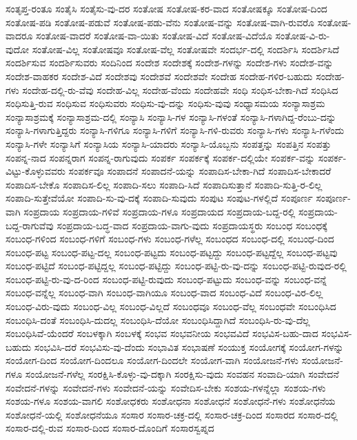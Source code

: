 {ಸಂತೃಪ್ತ-ರಂತೂ
ಸಂತೈಸಿ
ಸಂತೈಸು-ವು-ದರ
ಸಂತೋಷ
ಸಂತೋಷ-ಕರ-ವಾದ
ಸಂತೋಷಕ್ಕೂ
ಸಂತೋಷ-ದಿಂದ
ಸಂತೋಷ-ಪಡಿ
ಸಂತೋಷ-ಪಡುವೆ
ಸಂತೋಷ-ಪಡು-ವೆನು
ಸಂತೋಷ-ವನ್ನು
ಸಂತೋಷ-ವಾಗಿ-ರುವರೊ
ಸಂತೋಷ-ವಾದರೂ
ಸಂತೋಷ-ವಾದರೆ
ಸಂತೋಷ-ವಾ-ಯಿತು
ಸಂತೋಷ-ವಿದೆ
ಸಂತೋಷ-ವಿದೆಯೊ
ಸಂತೋಷ-ವಿ-ರು-ವುದೋ
ಸಂತೋಷ-ವಿಲ್ಲ
ಸಂತೋಷವೂ
ಸಂತೋಷ-ವೆಲ್ಲ
ಸಂತೋಷವೇ
ಸಂದರ್ಭ-ದಲ್ಲಿ
ಸಂದರ್ಶಿಸಿ
ಸಂದರ್ಶಿಸಿದೆ
ಸಂದರ್ಶಿಸುವ
ಸಂದರ್ಶಿಸುವರು
ಸಂದಿನಿಂದ
ಸಂದೇಶ
ಸಂದೇಶಕ್ಕೆ
ಸಂದೇಶ-ಗಳನ್ನು
ಸಂದೇಶ-ಗಳು
ಸಂದೇಶ-ವನ್ನು
ಸಂದೇಶ-ವಾಹಕರ
ಸಂದೇಶ-ವಿದೆ
ಸಂದೇಶವು
ಸಂದೇಶವೆ
ಸಂದೇಶವೇ
ಸಂದೇಹ
ಸಂದೇಹ-ಗಳಿರ-ಬಹುದು
ಸಂದೇಹ-ಗಳು
ಸಂದೇಹ-ದಲ್ಲಿ-ರು-ವೆವು
ಸಂದೇಹ-ವಿಲ್ಲ
ಸಂದೇಹ-ವೆಂದು
ಸಂದೇಹವೇ
ಸಂಧಿ
ಸಂಧಿಸ-ಬೇಕಾ-ಗಿದೆ
ಸಂಧಿಸಿದ
ಸಂಧಿಸುತ್ತಿ-ರುವ
ಸಂಧಿಸುವ
ಸಂಧಿಸುವರು
ಸಂಧಿಸು-ವು-ದನ್ನು
ಸಂಧಿಸು-ವುವು
ಸಂಧ್ಯಾಸಮಯ
ಸಂನ್ಯಾಸಾಶ್ರಮ
ಸಂನ್ಯಾಸಾಶ್ರಮಕ್ಕೆ
ಸಂನ್ಯಾಸಾಶ್ರಮ-ದಲ್ಲಿ
ಸಂನ್ಯಾಸಿ
ಸಂನ್ಯಾಸಿ-ಗಳ
ಸಂನ್ಯಾಸಿ-ಗಳಂತೆ
ಸಂನ್ಯಾಸಿ-ಗಳಾಗಿದ್ದ-ರೆಂಬು-ದನ್ನು
ಸಂನ್ಯಾಸಿ-ಗಳಾಗುತ್ತಿದ್ದರು
ಸಂನ್ಯಾಸಿ-ಗಳಿಗೂ
ಸಂನ್ಯಾಸಿ-ಗಳಿಗೆ
ಸಂನ್ಯಾಸಿ-ಗಳಿ-ರುವರು
ಸಂನ್ಯಾಸಿ-ಗಳು
ಸಂನ್ಯಾಸಿ-ಗಳೆಂದು
ಸಂನ್ಯಾಸಿ-ಗಳೇ
ಸಂನ್ಯಾಸಿಗೆ
ಸಂನ್ಯಾಸಿಯ
ಸಂನ್ಯಾಸಿ-ಯಾದರು
ಸಂನ್ಯಾಸಿ-ಯೊಬ್ಬನು
ಸಂಪತ್ತನ್ನು
ಸಂಪತ್ತಿನ
ಸಂಪತ್ತು
ಸಂಪನ್ನ-ನಾದ
ಸಂಪನ್ನರಾಗ
ಸಂಪನ್ನ-ರಾಗುವುದು
ಸಂಪರ್ಕ
ಸಂಪರ್ಕಕ್ಕೆ
ಸಂಪರ್ಕ-ದಲ್ಲಿಯೇ
ಸಂಪರ್ಕ-ವನ್ನು
ಸಂಪರ್ಕ-ವಿಟ್ಟು-ಕೊಳ್ಳುವವರು
ಸಂಪರ್ಕವೂ
ಸಂಪಾದನೆ
ಸಂಪಾದನೆ-ಯನ್ನು
ಸಂಪಾದಿಸ-ಬೇಕಾ-ಗಿದೆ
ಸಂಪಾದಿಸ-ಬೇಕಾದರೆ
ಸಂಪಾದಿಸ-ಬೇಕೊ
ಸಂಪಾದಿಸ-ಲಿಲ್ಲ
ಸಂಪಾದಿ-ಸಲು
ಸಂಪಾದಿ-ಸಿದೆ
ಸಂಪಾದಿಸುತ್ತಾನೆ
ಸಂಪಾದಿ-ಸುತ್ತಿ-ರ-ಲಿಲ್ಲ
ಸಂಪಾದಿ-ಸುತ್ತೇವೆಯೋ
ಸಂಪಾದಿ-ಸು-ವು-ದಕ್ಕೆ
ಸಂಪಾದಿ-ಸುವುದು
ಸಂಪುಟ
ಸಂಪುಟ-ಗಳಲ್ಲಿದೆ
ಸಂಪೂರ್ಣ
ಸಂಪೂರ್ಣ-ವಾಗಿ
ಸಂಪ್ರದಾಯ
ಸಂಪ್ರದಾಯ-ಗಳಿವೆ
ಸಂಪ್ರದಾಯ-ಗಳೂ
ಸಂಪ್ರದಾಯದ
ಸಂಪ್ರದಾಯ-ಬದ್ದ-ರಲ್ಲಿ
ಸಂಪ್ರದಾಯ-ಬದ್ದ-ರಾಗುವೆವು
ಸಂಪ್ರದಾಯ-ಬದ್ಧ-ವಾದ
ಸಂಪ್ರದಾಯ-ವಾಗು-ವುದು
ಸಂಪ್ರದಾಯಸ್ಥರು
ಸಂಬಂಧ
ಸಂಬಂಧಕ್ಕೆ
ಸಂಬಂಧ-ಗಳಿಂದ
ಸಂಬಂಧ-ಗಳಿಗೆ
ಸಂಬಂಧ-ಗಳು
ಸಂಬಂಧ-ಗಳೆಲ್ಲ
ಸಂಬಂಧದ
ಸಂಬಂಧ-ದಲ್ಲಿ
ಸಂಬಂಧ-ದಿಂದ
ಸಂಬಂಧ-ಪಟ್ಟ
ಸಂಬಂಧ-ಪಟ್ಟ-ದಲ್ಲ
ಸಂಬಂಧ-ಪಟ್ಟದು
ಸಂಬಂಧ-ಪಟ್ಟದ್ದು
ಸಂಬಂಧ-ಪಟ್ಟದ್ದೆಲ್ಲ
ಸಂಬಂಧ-ಪಟ್ಟವು
ಸಂಬಂಧ-ಪಟ್ಟಿದೆ
ಸಂಬಂಧ-ಪಟ್ಟಿದ್ದಲ್ಲ
ಸಂಬಂಧ-ಪಟ್ಟಿದ್ದು
ಸಂಬಂಧ-ಪಟ್ಟಿ-ರು-ವು-ದನ್ನು
ಸಂಬಂಧ-ಪಟ್ಟಿ-ರುವುದ-ರಲ್ಲಿ
ಸಂಬಂಧ-ಪಟ್ಟಿ-ರು-ವು-ದ-ರಿಂದ
ಸಂಬಂಧ-ಪಟ್ಟಿ-ರುವುದು
ಸಂಬಂಧ-ಪಟ್ಟುದು
ಸಂಬಂಧ-ವನ್ನು
ಸಂಬಂಧ-ವನ್ನೆ
ಸಂಬಂಧ-ವನ್ನೆಲ್ಲ
ಸಂಬಂಧ-ವಾಗಿ
ಸಂಬಂಧ-ವಾಗಿಯೂ
ಸಂಬಂಧ-ವಾದ
ಸಂಬಂಧ-ವಿದೆ
ಸಂಬಂಧ-ವಿರ-ಲಿಲ್ಲ
ಸಂಬಂಧ-ವಿರು-ವುದು
ಸಂಬಂಧ-ವಿಲ್ಲ
ಸಂಬಂಧ-ವಿಲ್ಲದೆ
ಸಂಬಂಧವೂ
ಸಂಬಂಧ-ವೆಲ್ಲ
ಸಂಬಂಧವೇ
ಸಂಬಂಧಿಸಿದ
ಸಂಬಂಧಿಸಿ-ದಂತೆ
ಸಂಬಂಧಿಸಿ-ದುದಲ್ಲ
ಸಂಬಂಧಿಸಿ-ದೆಯೋ
ಸಂಬಂಧಿಸಿದ್ದಾಗಿದೆ
ಸಂಬಂಧಿಸಿ-ರು-ವು-ದೆಲ್ಲ
ಸಂಬಂಧಿಸಿವೆ-ಯೆಂದರೆ
ಸಂಬಳಕ್ಕಾಗಿ
ಸಂಬಳಕ್ಕೆ
ಸಂಭವ
ಸಂಭವನೀಯ
ಸಂಭವವಿದೆ
ಸಂಭವಿಸ-ಬಹು-ದಾದ
ಸಂಭವಿಸ-ಬಹುದು
ಸಂಭವಿಸಿ-ದರೆ
ಸಂಭವಿಸು-ವು-ದೆಂದು
ಸಂಭಾವಿತ
ಸಂಭಾಷಣೆ
ಸಂಯುಕ್ತ
ಸಂಯೋಗಕ್ಕೆ
ಸಂಯೋಗ-ಗಳನ್ನು
ಸಂಯೋಗ-ದಿಂದ
ಸಂಯೋಗ-ದಿಂದಲೂ
ಸಂಯೋಗ-ದಿಂದಲೇ
ಸಂಯೋಗ-ವಾಗಿ
ಸಂಯೋಜನೆ-ಗಳು
ಸಂಯೋಜನೆ-ಗಳೂ
ಸಂಯೋಜನೆ-ಗಳೆಲ್ಲ
ಸಂರಕ್ಷಿಸಿ-ಕೊಳ್ಳು-ವು-ದಕ್ಕಾಗಿ
ಸಂರಕ್ಷಿಸು-ವುದು
ಸಂವಹನ
ಸಂವಾದಿ-ಯಾಗಿ
ಸಂವೇದನೆ
ಸಂವೇದನೆ-ಗಳನ್ನು
ಸಂವೇದನೆ-ಗಳು
ಸಂವೇದನೆ-ಯನ್ನು
ಸಂವೇದಿಸ-ಬೇಕು
ಸಂಶಯ-ಗಳನ್ನೆಲ್ಲಾ
ಸಂಶಯ-ಗಳು
ಸಂಶಯ-ಗಳೂ
ಸಂಶಯ-ವಾಗಲಿ
ಸಂಶೋಧಕರು
ಸಂಶೋಧನಾ
ಸಂಶೋಧನೆ
ಸಂಶೋಧನೆ-ಗಳು
ಸಂಶೋಧನೆಯ
ಸಂಶೋಧನೆ-ಯಲ್ಲಿ
ಸಂಶೋಧನೆಯೂ
ಸಂಸಾರ
ಸಂಸಾರ-ಚಕ್ರ-ದಲ್ಲಿ
ಸಂಸಾರ-ಚಕ್ರ-ದಿಂದ
ಸಂಸಾರದ
ಸಂಸಾರ-ದಲ್ಲಿ
ಸಂಸಾರ-ದಲ್ಲಿ-ರುವ
ಸಂಸಾರ-ದಿಂದ
ಸಂಸಾರ-ದೊಂದಿಗೆ
ಸಂಸಾರಸ್ವಪ್ನದ
}
